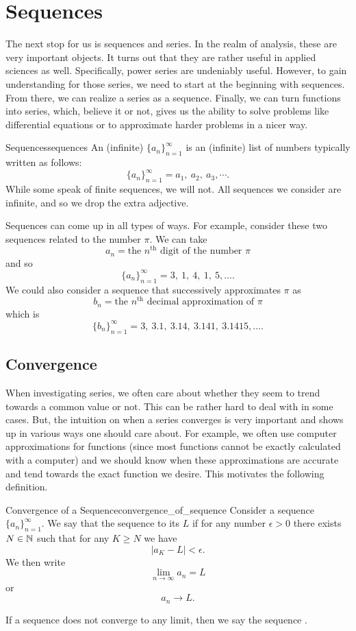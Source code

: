 \section{Sequences}
The next stop for us is sequences and series.  In the realm of analysis, these are very important objects.  It turns out that they are rather useful in applied sciences as well.  Specifically, power series are undeniably useful.  However, to gain understanding for those series, we need to start at the beginning with sequences.  From there, we can realize a series as a sequence.  Finally, we can turn functions into series, which, believe it or not, gives us the ability to solve problems like differential equations or to approximate harder problems in a nicer way.

\begin{df}{Sequences}{sequences}
An (infinite)  $\{a_n\}_{n=1}^\infty$ is an (infinite) list of numbers typically written as follows:
\[
\{a_n\}_{n=1}^\infty = a_1,~ a_2,~ a_3, \cdots.
\]
While some speak of finite sequences, we will not.  All sequences we consider are infinite, and so we drop the extra adjective.
\end{df}

Sequences can come up in all types of ways.  For example, consider these two sequences related to the number $\pi$.  We can take
\[
a_n = \textrm{the $n^\textrm{th}$ digit of the number $\pi$}
\]
and so 
\[
\{a_n\}_{n=1}^\infty = 3,~1,~4,~1,~5, \dots.
\]
We could also consider a sequence that successively approximates $\pi$ as
\[
b_n = \textrm{the $n^\textrm{th}$ decimal approximation of $\pi$}
\]
which is
\[
\{b_n\}_{n=1}^\infty = 3,~3.1, ~ 3.14, ~ 3.141, ~ 3.1415, \dots.
\]

\subsection{Convergence}
When investigating series, we often care about whether they seem to trend towards a common value or not.  This can be rather hard to deal with in some cases.  But, the intuition on when a series converges is very important and shows up in various ways one should care about.  For example, we often use computer approximations for functions (since most functions cannot be exactly calculated with a computer) and we should know when these approximations are accurate and tend towards the exact function we desire.  This motivates the following definition.

\begin{df}{Convergence of a Sequence}{convergence_of_sequence}
Consider a sequence $\{a_n\}_{n=1}^\infty$.  We say that the sequence  to its  $L$ if for any number $\epsilon>0$ there exists $N\in \mathbb{N}$ such that for any $K\geq N$ we have
\[
|a_{K}-L|<\epsilon.
\]
We then write
\[
\lim_{n\to \infty} a_n = L
\]
or
\[
a_n \to L.
\]

If a sequence does not converge to any limit, then we say the sequence .
\end{df}

